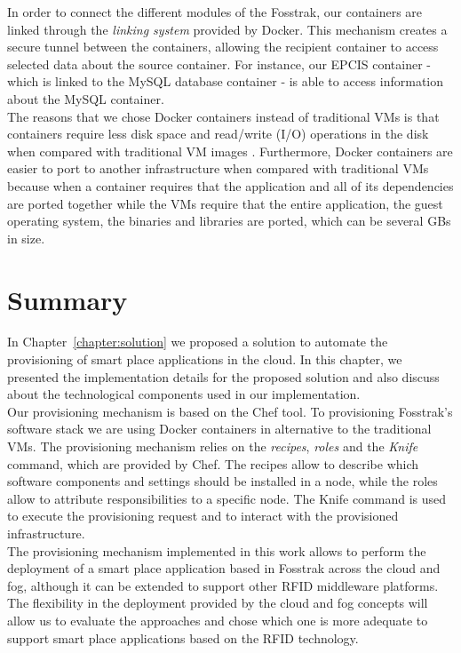 In order to connect the different modules of the Fosstrak, our containers are
linked through the \textit{linking system} provided by Docker. This mechanism creates a secure tunnel
between the containers, allowing the recipient container to access selected data about the source container.
For instance, our \gls{EPCIS} container - which is linked to the MySQL database container - is able to
access information about the MySQL container.\\

The reasons that we chose Docker containers instead of traditional \glspl{VM} is that containers
require less disk space and read/write (I/O) operations in the disk when compared with traditional
\gls{VM} images \cite{merkel2014docker}. Furthermore, Docker containers are easier to port to another
infrastructure when compared with traditional \glspl{VM} because when a container requires that the
application and all of its dependencies are ported together while the \glspl{VM} require that the
entire application, the guest operating system, the binaries and libraries are ported, which can be
several \glspl{GB} in size.

\section{Summary}
\label{sec:impl_summary}
In Chapter~\ref{chapter:solution} we proposed a solution to automate the provisioning of smart place
applications in the cloud. In this chapter, we presented the implementation details for the proposed
solution and also discuss about the technological components used in our implementation.\\

Our provisioning mechanism is based on the Chef tool. To provisioning Fosstrak's software stack we are
using Docker containers in alternative to the traditional \glspl{VM}. The provisioning mechanism relies
on the \textit{recipes}, \textit{roles} and the \textit{Knife} command, which are provided by Chef.
The recipes allow to describe which software components and settings should be installed in a node,
while the roles allow to attribute responsibilities to a specific node. The Knife command is used
to execute the provisioning request and to interact with the provisioned infrastructure.\\

The provisioning mechanism implemented in this work allows to perform the deployment of a smart place
application based in Fosstrak across the cloud and fog, although it can be extended to support other
\gls{RFID} middleware platforms. The flexibility in the deployment provided by the cloud and fog
concepts will allow us to evaluate the approaches and chose which one is more adequate to support smart
place applications based on the \gls{RFID} technology.
